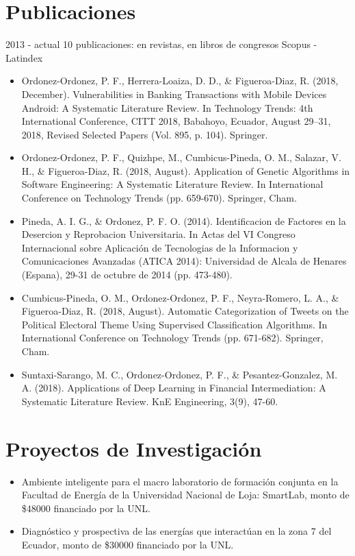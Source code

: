 \documentclass[]{cv-style} %
\begin{document}
\section{Publicaciones} %
\vspace{-0.3cm}
\begin{entrylist}
\entry
    {2013 - actual}
    {10 publicaciones: {} en revistas, {} en libros de congresos}
    {Scopus - Latindex}
    {

\begin{itemize}
\item \small Ordonez-Ordonez, P. F., Herrera-Loaiza, D. D., \& Figueroa-Diaz, R. (2018, December). Vulnerabilities in Banking Transactions with Mobile Devices Android: A Systematic Literature Review. In Technology Trends: 4th International Conference, CITT 2018, Babahoyo, Ecuador, August 29–31, 2018, Revised Selected Papers (Vol. 895, p. 104). Springer.
\item Ordonez-Ordonez, P. F., Quizhpe, M., Cumbicus-Pineda, O. M., Salazar, V. H., \& Figueroa-Diaz, R. (2018, August). Application of Genetic Algorithms in Software Engineering: A Systematic Literature Review. In International Conference on Technology Trends (pp. 659-670). Springer, Cham.
\item Pineda, A. I. G., \& Ordonez, P. F. O. (2014). Identificacion de Factores en la Desercion y Reprobacion Universitaria. In Actas del VI Congreso Internacional sobre Aplicación de Tecnologias de la Informacion y Comunicaciones Avanzadas (ATICA 2014): Universidad de Alcala de Henares (Espana), 29-31 de octubre de 2014 (pp. 473-480).
\item Cumbicus-Pineda, O. M., Ordonez-Ordonez, P. F., Neyra-Romero, L. A., \& Figueroa-Diaz, R. (2018, August). Automatic Categorization of Tweets on the Political Electoral Theme Using Supervised Classification Algorithms. In International Conference on Technology Trends (pp. 671-682). Springer, Cham.
\item Suntaxi-Sarango, M. C., Ordonez-Ordonez, P. F., \& Pesantez-Gonzalez, M. A. (2018). Applications of Deep Learning in Financial Intermediation: A Systematic Literature Review. KnE Engineering, 3(9), 47-60.
\end{itemize}
}
\end{entrylist} 
\section{Proyectos de Investigación}
\vspace{-0.3cm}
\begin{itemize}
    \item  \small Ambiente inteligente para el macro laboratorio de formación conjunta en la Facultad de Energía de la Universidad Nacional de Loja: SmartLab, monto de \$48000 financiado por la UNL.
    \item \small Diagnóstico y prospectiva de las energías que interactúan en la zona 7 del Ecuador, monto de \$30000 financiado por la UNL.
\end{itemize}
\end{document}
